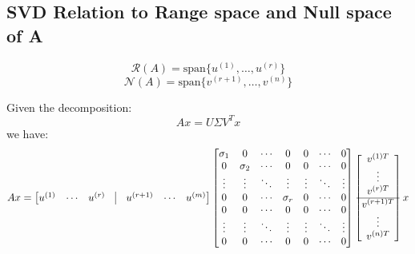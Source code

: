 \subsection{SVD Relation to Range space and Null space of A}
\begin{definition}
    \begin{equation*}
        \mathcal{R}(A) = \text{span} \{ u^{(1)}, \dots, u^{(r)} \}
    \end{equation*}
    \begin{equation*}
        \mathcal{N}(A) = \text{span} \{ v^{(r+1)}, \dots, v^{(n)} \}
    \end{equation*}
\end{definition}
\begin{derivation}
    Given the decomposition:
    \[
    A x = U \Sigma V^T x
    \]
    we have:
    \[
    A x = 
    \begin{bmatrix}
    u^{(1)} & \cdots & u^{(r)} & \vline & u^{(r+1)} & \cdots & u^{(m)}
    \end{bmatrix}
    \begin{bmatrix}
        \sigma_1 & 0 & \cdots & 0 & 0 & \cdots & 0 \\
        0 & \sigma_2 & \cdots & 0 & 0 & \cdots & 0 \\
        \vdots & \vdots & \ddots & \vdots & \vdots & \ddots & \vdots \\
        0 & 0 & \cdots & \sigma_r & 0 & \cdots & 0 \\
        0 & 0 & \cdots & 0 & 0 & \cdots & 0 \\
        \vdots & \vdots & \ddots & \vdots & \vdots & \ddots & \vdots \\
        0 & 0 & \cdots & 0 & 0 & \cdots & 0
    \end{bmatrix}
    \begin{bmatrix}
    v^{(1) T} \\
    \vdots \\
    v^{(r) T} \\
    \hline
    v^{(r+1) T} \\
    \vdots \\
    v^{(n) T}
    \end{bmatrix} x
    \]


\end{derivation}
